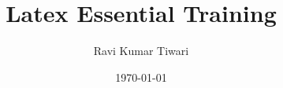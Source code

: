 \documentclass{article}
\begin{document}
\title{Latex Essential Training}
\author{Ravi Kumar Tiwari}
\date{\today}
\maketitle



%
%
%
%
%
%
%
%
%
%

%
%
%
%
%
%
%
%
%
%
%
%
%
%
%
%
%
%
%
%
%
%
%
%
%
%
%
%
%
\end{document}
